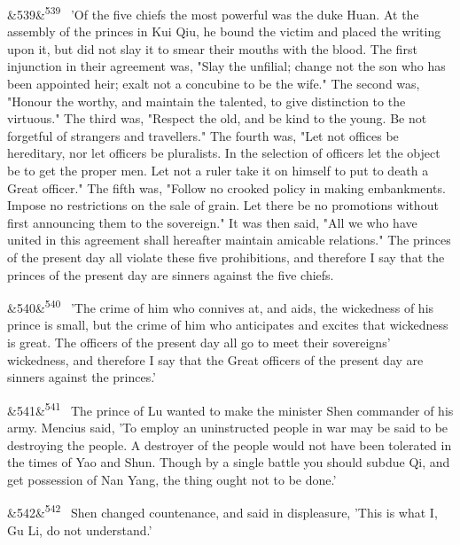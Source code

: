 \documentclass[12pt]{article}
\newcommand{\para}[1][]{\par\noindent\ifx&#1&\else\textsuperscript{\footnotesize #1}~\fi}
\begin{document}
\para[539] 'Of the five chiefs the most powerful was the duke Huan. At the assembly of the princes in Kui Qiu, he bound the victim and placed the writing upon it, but did not slay it to smear their mouths with the blood. The first injunction in their agreement was, "Slay the unfilial; change not the son who has been appointed heir; exalt not a concubine to be the wife." The second was, "Honour the worthy, and maintain the talented, to give distinction to the virtuous." The third was, "Respect the old, and be kind to the young. Be not forgetful of strangers and travellers." The fourth was, "Let not offices be hereditary, nor let officers be pluralists. In the selection of officers let the object be to get the proper men. Let not a ruler take it on himself to put to death a Great officer." The fifth was, "Follow no crooked policy in making embankments. Impose no restrictions on the sale of grain. Let there be no promotions without first announcing them to the sovereign." It was then said, "All we who have united in this agreement shall hereafter maintain amicable relations." The princes of the present day all violate these five prohibitions, and therefore I say that the princes of the present day are sinners against the five chiefs.

\para[540] 'The crime of him who connives at, and aids, the wickedness of his prince is small, but the crime of him who anticipates and excites that wickedness is great. The officers of the present day all go to meet their sovereigns' wickedness, and therefore I say that the Great officers of the present day are sinners against the princes.'

\para[541] The prince of Lu wanted to make the minister Shen commander of his army. Mencius said, 'To employ an uninstructed people in war may be said to be destroying the people. A destroyer of the people would not have been tolerated in the times of Yao and Shun. Though by a single battle you should subdue Qi, and get possession of Nan Yang, the thing ought not to be done.'

\para[542] Shen changed countenance, and said in displeasure, 'This is what I, Gu Li, do not understand.'
\end{document}
